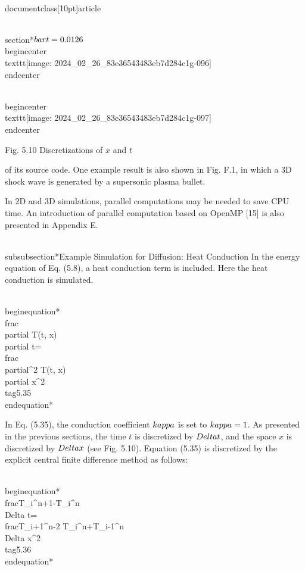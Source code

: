 \\documentclass[10pt]{article}
\begin{document}
{\\section*{$\\bar{t}=0.0126$}
\\begin{center}
\\texttt{[image: 2024\_02\_26\_83e36543483eb7d284c1g-096]}
\\end{center}

\\begin{center}
\\texttt{[image: 2024\_02\_26\_83e36543483eb7d284c1g-097]}
\\end{center}

Fig. 5.10 Discretizations of $x$ and $t$

of its source code. One example result is also shown in Fig. F.1, in which a 3D shock wave is generated by a supersonic plasma bullet.

In 2D and 3D simulations, parallel computations may be needed to save CPU time. An introduction of parallel computation based on OpenMP [15] is also presented in Appendix E.

\\subsubsection*{Example Simulation for Diffusion: Heat Conduction}
In the energy equation of Eq. (5.8), a heat conduction term is included. Here the heat conduction is simulated.


\\begin{equation*}
\\frac{\\partial T(t, x)}{\\partial t}=\\frac{\\partial^{2} T(t, x)}{\\partial x^{2}} \\tag{5.35}
\\end{equation*}


In Eq. (5.35), the conduction coefficient $\\kappa$ is set to $\\kappa=1$. As presented in the previous sections, the time $t$ is discretized by $\\Delta t$, and the space $x$ is discretized by $\\Delta x$ (see Fig. 5.10). Equation (5.35) is discretized by the explicit central finite difference method as follows:


\\begin{equation*}
\\frac{T_{i}^{n+1}-T_{i}^{n}}{\\Delta t}=\\frac{T_{i+1}^{n}-2 T_{i}^{n}+T_{i-1}^{n}}{\\Delta x^{2}} \\tag{5.36}
\\end{equation*}


}
\end{document}
